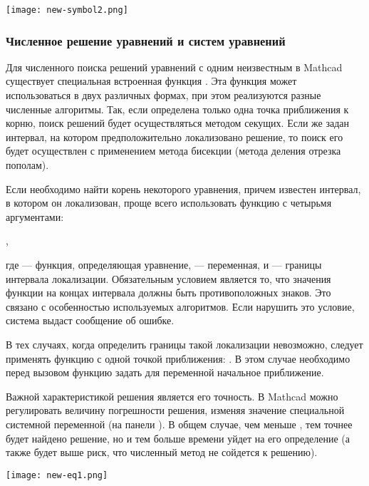 \begin{center}
	\texttt{[image: new-symbol2.png]}
\end{center}



\subsubsection*{Численное решение уравнений и систем уравнений}
Для численного поиска решений уравнений с одним неизвестным в Mathcad существует специальная встроенная функция . Эта функция может использоваться в двух различных формах, при этом реализуются разные численные алгоритмы. Так, если определена только одна точка приближения к корню, поиск решений будет осуществляться методом секущих. Если же задан интервал, на котором предположительно локализовано решение, то поиск его будет осуществлен с применением метода бисекции (метода деления отрезка пополам).

Если необходимо найти корень некоторого уравнения, причем известен интервал, в котором он локализован, проще всего использовать функцию  с четырьмя аргументами: 
\begin{center}
,
\end{center}
 где  --- функция, определяющая уравнение,  --- переменная,  и  --- границы интервала локализации. Обязательным условием является то, что значения функции на концах интервала должны быть противоположных знаков. Это связано с особенностью используемых  алгоритмов. Если нарушить это условие, система выдаст сообщение об ошибке.

В тех случаях, когда определить границы такой локализации невозможно, следует применять функцию  с одной точкой приближения: . В этом случае необходимо перед вызовом функцию  задать для переменной  начальное приближение.

Важной характеристикой решения является его точность. В Mathcad можно регулировать величину погрешности решения, изменяя значение специальной системной переменной  (на панели ). В общем случае, чем меньше , тем точнее будет найдено решение, но и тем больше времени уйдет на его определение (а также будет выше риск, что численный метод не сойдется к решению).

\begin{center}
	\texttt{[image: new-eq1.png]}
\end{center}

